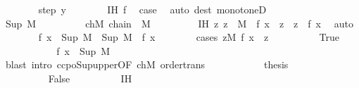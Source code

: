 \begin{isabellebody}
\ \ \ \ \ \ \isamarkupfalse%
\ {\isacharparenleft}{\kern0pt}step\ y{\isacharparenright}{\kern0pt}\isanewline
\ \ \ \ \ \ \isamarkupfalse%
\ IH\ f\ \isamarkupfalse%
\ {\isacharquery}{\kern0pt}case\ \isamarkupfalse%
\ {\isacharparenleft}{\kern0pt}auto\ dest{\isacharcolon}{\kern0pt}\ monotoneD{\isacharparenright}{\kern0pt}\isanewline
\ \ \ \ \isamarkupfalse%
\isanewline
\ \ \ \ \ \ \isamarkupfalse%
\ {\isacharparenleft}{\kern0pt}Sup\ M{\isacharparenright}{\kern0pt}\isanewline
\ \ \ \ \ \ \isamarkupfalse%
\ \isamarkupfalse%
\ chM{\isacharcolon}{\kern0pt}\ {\isachardoublequoteopen}chain\ {\isacharparenleft}{\kern0pt}{\isasymle}{\isacharparenright}{\kern0pt}\ M{\isachardoublequoteclose}\isanewline
\ \ \ \ \ \ \ \ \ IH{\isacharprime}{\kern0pt}{\isacharcolon}{\kern0pt}\ {\isachardoublequoteopen}{\isasymAnd}z{\isachardot}{\kern0pt}\ z\ {\isasymin}\ M\ {\isasymLongrightarrow}\ f\ x\ {\isasymle}\ z\ {\isasymor}\ z\ {\isasymle}\ f\ x{\isachardoublequoteclose}\ \isamarkupfalse%
\ auto\isanewline
\ \ \ \ \ \ \isamarkupfalse%
\ {\isachardoublequoteopen}f\ x\ {\isasymle}\ Sup\ M\ {\isasymor}\ Sup\ M\ {\isasymle}\ f\ x{\isachardoublequoteclose}\isanewline
\ \ \ \ \ \ \isamarkupfalse%
\ {\isacharparenleft}{\kern0pt}cases\ {\isachardoublequoteopen}{\isasymexists}z{\isasymin}M{\isachardot}{\kern0pt}\ f\ x\ {\isasymle}\ z{\isachardoublequoteclose}{\isacharparenright}{\kern0pt}\isanewline
\ \ \ \ \ \ \ \ \isamarkupfalse%
\ True\isanewline
\ \ \ \ \ \ \ \ \isamarkupfalse%
\ \isamarkupfalse%
\ {\isachardoublequoteopen}f\ x\ {\isasymle}\ Sup\ M{\isachardoublequoteclose}\isanewline
\ \ \ \ \ \ \ \ \ \ \isamarkupfalse%
\ {\isacharparenleft}{\kern0pt}blast\ intro{\isacharcolon}{\kern0pt}\ ccpo{\isacharunderscore}{\kern0pt}Sup{\isacharunderscore}{\kern0pt}upper{\isacharbrackleft}{\kern0pt}OF\ chM{\isacharbrackright}{\kern0pt}\ order{\isacharunderscore}{\kern0pt}trans{\isacharparenright}{\kern0pt}\isanewline
\ \ \ \ \ \ \ \ \isamarkupfalse%
\ \isamarkupfalse%
\ {\isacharquery}{\kern0pt}thesis\ \isacommand{{\isachardot}{\kern0pt}{\isachardot}{\kern0pt}}\isamarkupfalse%
\isanewline
\ \ \ \ \ \ \isamarkupfalse%
\isanewline
\ \ \ \ \ \ \ \ \isamarkupfalse%
\ False\isanewline
\ \ \ \ \ \ \ \ \isamarkupfalse%
\ IH{\isacharprime}{\kern0pt}\ \isamarkupfalse%

\end{isabellebody}
